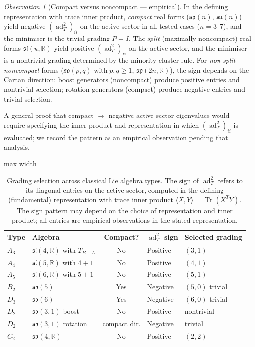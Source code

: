 \documentclass[11pt]{article}
\theoremstyle{plain}
\theoremstyle{definition}
\theoremstyle{remark}
\newtheorem*{observation}{Observation}
\newcommand{\sln}[1]{\mathfrak{sl}(#1,\mathbb{R})}
\newcommand{\TBL}{T_{B\!-\!L}}
\newcommand{\ad}{\operatorname{ad}}
\newcommand{\Tr}{\operatorname{Tr}}
\begin{document}
\begin{observation}[Compact versus noncompact --- empirical]
\label{obs:compact}
In the defining representation with trace inner product,
\emph{compact} real forms ($\mathfrak{so}(n)$, $\mathfrak{su}(n)$)
yield negative $(\ad_T^2)_{ii}$ on the active sector in all tested
cases ($n = 3$--$7$), and the minimiser is the trivial grading
$P = I$.  The \emph{split} (maximally noncompact) real forms
$\sln{n}$ yield positive $(\ad_T^2)_{ii}$ on the active sector,
and the minimiser is a nontrivial grading determined by the
minority-cluster rule.  For \emph{non-split noncompact} forms
($\mathfrak{so}(p,q)$ with $p, q \ge 1$,
$\mathfrak{sp}(2n,\mathbb{R})$), the sign depends on the Cartan
direction: boost generators (noncompact) produce positive entries
and nontrivial selection; rotation generators (compact) produce
negative entries and trivial selection.

A general proof that compact $\Rightarrow$ negative active-sector
eigenvalues would require specifying the inner product and
representation in which $(\ad_T^2)_{ii}$ is evaluated; we record
the pattern as an empirical observation pending that analysis.
\end{observation}

\begin{table}[h]
\centering\small
\begin{adjustbox}{max width=\linewidth}\begin{tabular}{@{}llcll@{}}
\toprule
Type & Algebra & Compact? & $\ad_T^2$ sign & Selected grading \\
\midrule
$A_3$ & $\sln{4}$ with $\TBL$ & No & Positive & $(3,1)$ \\
$A_4$ & $\sln{5}$ with $4{+}1$ & No & Positive & $(4,1)$ \\
$A_5$ & $\sln{6}$ with $5{+}1$ & No & Positive & $(5,1)$ \\
$B_2$ & $\mathfrak{so}(5)$ & Yes & Negative & $(5,0)$ trivial \\
$D_3$ & $\mathfrak{so}(6)$ & Yes & Negative & $(6,0)$ trivial \\
$D_2$ & $\mathfrak{so}(3,1)$ boost & No & Positive & nontrivial \\
$D_2$ & $\mathfrak{so}(3,1)$ rotation & compact dir. & Negative & trivial \\
$C_2$ & $\mathfrak{sp}(4,\mathbb{R})$ & No & Positive & $(2,2)$ \\
\bottomrule
\end{tabular}\end{adjustbox}
\caption{Grading selection across classical Lie algebra types.
The sign of $\ad_T^2$ refers to its diagonal entries on the active
sector, computed in the defining (fundamental) representation with
trace inner product $\langle X, Y \rangle = \Tr(X^T Y)$.  The sign
pattern may depend on the choice of representation and inner product;
all entries are empirical observations in the stated representation.}
\label{tab:cross-type}
\end{table}
\end{document}

